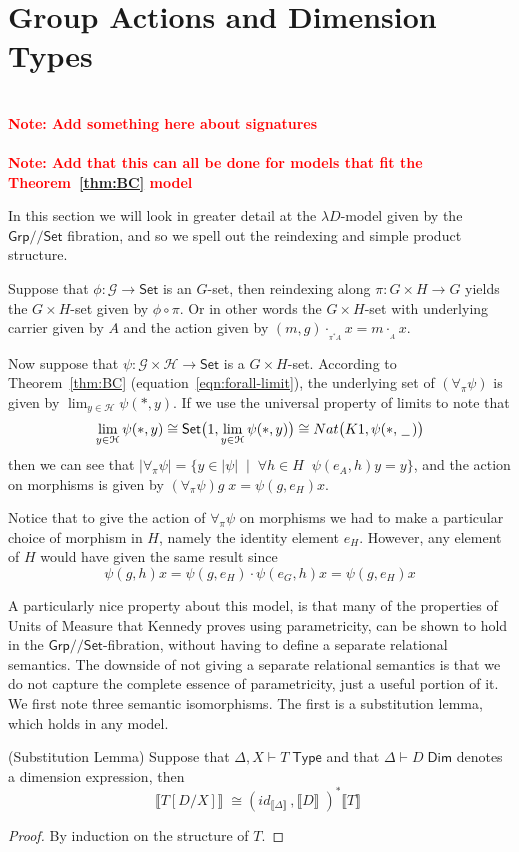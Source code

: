 \documentclass[a4paper,UKenglish]{lipics}
\newcommand\note[1]{{ \bf \textcolor{red} {\vspace{2mm}\; \\ Note: #1\\}}}
\newcommand{\UoM}{Units of Measure\xspace}
\newcommand{\msf}[1]{\mathsf{#1}} %
\newcommand{\Grp}{\msf{Grp}}
\newcommand{\Set}{\msf{Set}}
\newcommand{\blank}{\, \underline{\hspace{2mm}} \,}
\newcommand{\act}[1]{\cdot_{_{#1}}}
\newcommand{\GroupSet}[1]{#1/\!/\Set}
\newcommand{\GrpSet}{\GroupSet{\Grp}}
\newcommand{\bbracket}[1]{\bigl( #1 \bigr)}
\newcommand{\sem}[1]{\ensuremath{\llbracket #1 \rrbracket} \;}
\newcommand{\Dj}[2]{#1 \vdash #2 \; \msf{ Dim}}
\newcommand{\Dim}{D}
\begin{document}
\section{Group Actions and Dimension Types}\label{sec:MonSet}
\note{Add something here about signatures}
\note{Add that this can all be done for models that fit the Theorem~\ref{thm:BC} model}

\noindent In this section we will look in greater detail at the $\lambda D$-model given by the $\GrpSet$ fibration, and so we spell out the reindexing and simple product structure.


Suppose that $\phi: \mathcal{G}\rightarrow \Set$ is an $G$-set, then reindexing along $\pi : G \times H \rightarrow G$ yields the $G \times H$-set given by $\phi \circ \pi$. Or in other words the $G \times H$-set with underlying carrier given by $A$ and the action given by $(m,g) \act{\pi^{\ast}A} x = m \act{A} x$.

Now suppose that $\psi : \mathcal{G} \times \mathcal{H} \rightarrow\Set $ is a $G \times H$-set. According to Theorem~\ref{thm:BC} (equation~\eqref{eqn:forall-limit}),
the underlying set of $ (\forall _\pi \psi)$ is given by $\lim_{y\in \mathcal{H}} \psi (\ast, y)$. If we use the universal property of limits to note that
\[
 \lim_{y\in \mathcal{H}} \psi (\ast, y) \cong \Set \bbracket{1, \lim_{y\in \mathcal{H}} \psi (\ast, y)} \cong Nat \bbracket{K1, \psi (\ast, \blank)}
\]
then we can see that $|\forall_\pi \psi | = \{y \in |\psi| \; \; | \; \; \forall h\in H \; \; \psi(e_A, h) y = y \}$, and the action on morphisms is given by $(\forall_\pi \psi) g \; x = \psi (g, e_H) x$.

Notice that to give the action of $\forall_\pi \psi$ on morphisms we had to make a particular choice of morphism in $H$, namely the identity element $e_H$. However, any element of $H$ would have given the same result since
\[
  \psi (g, h) x = \psi (g, e_H) \cdot \psi (e_G, h) x = \psi (g, e_H) x
\]


A particularly nice property about this model, is that many of the properties of \UoM that Kennedy proves using parametricity, can be shown to hold in the $\GrpSet$-fibration, without having to define a separate relational semantics. The downside of not giving a separate relational semantics is that we do not capture the complete essence of parametricity, just a useful portion of it. We first note three semantic isomorphisms. The first is a substitution lemma, which holds in any model.

\begin{lemma}(Substitution Lemma)
\label{lem:subst}
Suppose that $\Delta, X \vdash T \; \msf{ Type}$ and that $\Dj\Delta \Dim$ denotes a dimension expression, then
\[
 \sem{T[D/X]} \cong (id_{\sem{\Delta}} , \sem{D})^\ast \sem{T}
\]
\end{lemma}
\begin{proof}
 By induction on the structure of $T$.
\end{proof}
\end{document}
